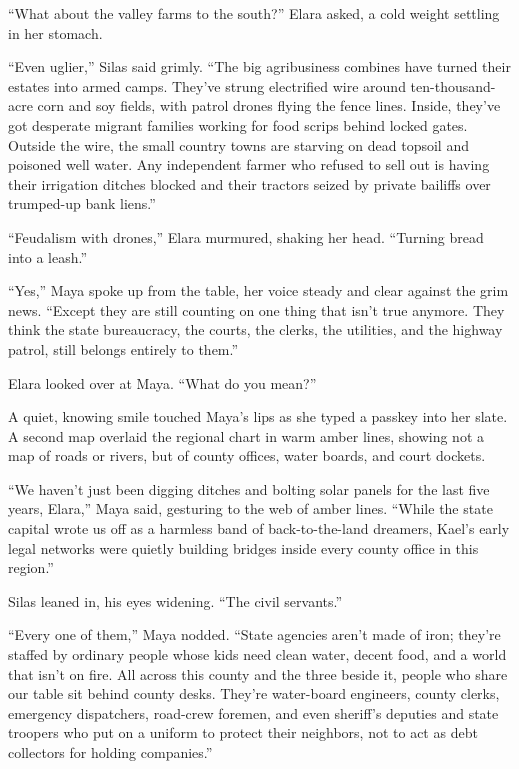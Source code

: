 ``What about the valley farms to the south?'' Elara asked, a cold weight settling in her stomach.

``Even uglier,'' Silas said grimly. ``The big agribusiness combines have turned their estates into armed camps. They’ve strung electrified wire around ten-thousand-acre corn and soy fields, with patrol drones flying the fence lines. Inside, they've got desperate migrant families working for food scrips behind locked gates. Outside the wire, the small country towns are starving on dead topsoil and poisoned well water. Any independent farmer who refused to sell out is having their irrigation ditches blocked and their tractors seized by private bailiffs over trumped-up bank liens.''

``Feudalism with drones,'' Elara murmured, shaking her head. ``Turning bread into a leash.''

``Yes,'' Maya spoke up from the table, her voice steady and clear against the grim news. ``Except they are still counting on one thing that isn't true anymore. They think the state bureaucracy, the courts, the clerks, the utilities, and the highway patrol, still belongs entirely to them.''

Elara looked over at Maya. ``What do you mean?''

A quiet, knowing smile touched Maya’s lips as she typed a passkey into her slate. A second map overlaid the regional chart in warm amber lines, showing not a map of roads or rivers, but of county offices, water boards, and court dockets.

``We haven't just been digging ditches and bolting solar panels for the last five years, Elara,'' Maya said, gesturing to the web of amber lines. ``While the state capital wrote us off as a harmless band of back-to-the-land dreamers, Kael’s early legal networks were quietly building bridges inside every county office in this region.''

Silas leaned in, his eyes widening. ``The civil servants.''

``Every one of them,'' Maya nodded. ``State agencies aren't made of iron; they're staffed by ordinary people whose kids need clean water, decent food, and a world that isn't on fire. All across this county and the three beside it, people who share our table sit behind county desks. They're water-board engineers, county clerks, emergency dispatchers, road-crew foremen, and even sheriff’s deputies and state troopers who put on a uniform to protect their neighbors, not to act as debt collectors for holding companies.''

